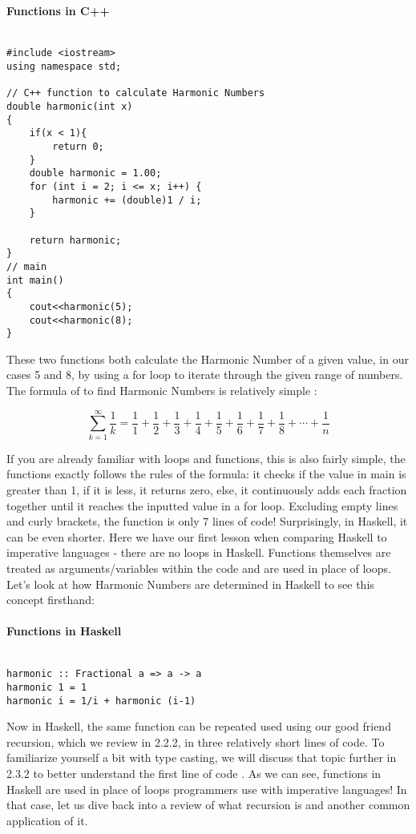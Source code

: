 \documentclass{article}
\begin{document}
\paragraph{Functions in C++}
\begin{lstlisting}

#include <iostream>
using namespace std;
 
// C++ function to calculate Harmonic Numbers
double harmonic(int x)
{
    if(x < 1){
        return 0;
    }
    double harmonic = 1.00;
    for (int i = 2; i <= x; i++) {
        harmonic += (double)1 / i;
    }
 
    return harmonic;
}
// main
int main()
{
    cout<<harmonic(5);
    cout<<harmonic(8);
}
\end{lstlisting}
\noindent
These two functions both calculate the Harmonic Number of a given value, in our cases 5 and 8, by using a for loop to iterate through the given range of numbers. The formula of to find Harmonic Numbers is relatively simple \cite{Harmonic Numbers}:

\[ \sum_{k=1}^{\infty}\frac{1}{k}  = \frac{1}{1} + \frac{1}{2} + \frac{1}{3} + \frac{1}{4} + \frac{1}{5} + \frac{1}{6} + \frac{1}{7} + \frac{1}{8} + \cdots + \frac{1}{n} \]

\noindent
If you are already familiar with loops and functions, this is also fairly simple, the functions exactly follows the rules of the formula: it checks if the value in main is greater than 1, if it is less, it returns zero, else, it continuously adds each fraction together until it reaches the inputted value in a for loop. Excluding empty lines and curly brackets, the function is only 7 lines of code! Surprisingly, in Haskell, it can be even shorter. Here we have our first lesson when comparing Haskell to imperative languages - there are no loops in Haskell. Functions themselves are treated as arguments/variables within the code and are used in place of loops. Let's look at how Harmonic Numbers are determined in Haskell to see this concept firsthand: 

\paragraph{Functions in Haskell}
\begin{lstlisting}

harmonic :: Fractional a => a -> a 
harmonic 1 = 1 
harmonic i = 1/i + harmonic (i-1)
\end{lstlisting}

\noindent
Now in Haskell, the same function can be repeated used using our good friend recursion, which we review in 2.2.2, in three relatively short lines of code. To familiarize yourself a bit with type casting, we will discuss that topic further in 2.3.2 to better understand the first line of code \cite{Haskell.org Fractional}. As we can see, functions in Haskell are used in place of loops programmers use with imperative languages! In that case, let us dive back into a review of what recursion is and another common application of it.
\end{document}

